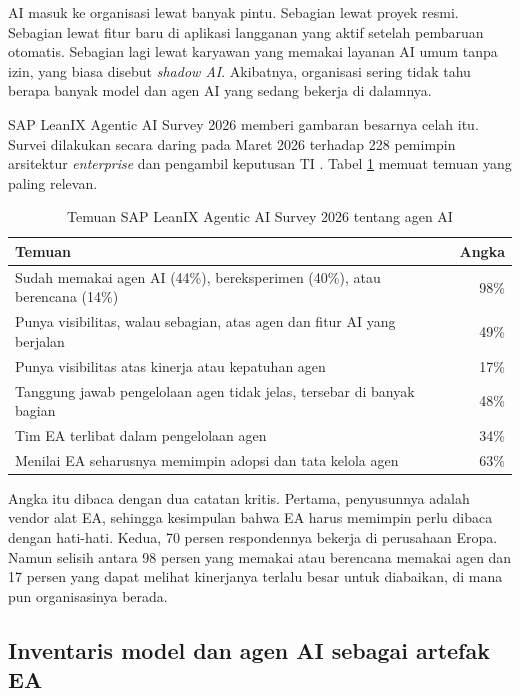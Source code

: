 AI masuk ke organisasi lewat banyak pintu. Sebagian lewat proyek resmi.
Sebagian lewat fitur baru di aplikasi langganan yang aktif setelah pembaruan
otomatis. Sebagian lagi lewat karyawan yang memakai layanan AI umum tanpa
izin, yang biasa disebut \textit{shadow AI}. Akibatnya, organisasi sering tidak
tahu berapa banyak model dan agen AI yang sedang bekerja di dalamnya.

SAP LeanIX Agentic AI Survey 2026 memberi gambaran besarnya celah itu. Survei
dilakukan secara daring pada Maret 2026 terhadap 228 pemimpin arsitektur
\textit{enterprise} dan pengambil keputusan TI \cite{leanix2026}. Tabel
\ref{tab:ch10-leanix} memuat temuan yang paling relevan.

\begin{table}[!htb]
  \centering
  \caption{Temuan SAP LeanIX Agentic AI Survey 2026 tentang agen AI}
  \label{tab:ch10-leanix}
  \small
  \begin{tabularx}{\textwidth}{Xr}
    \hline
    \textbf{Temuan} & \textbf{Angka} \\
    \hline
    Sudah memakai agen AI (44\%), bereksperimen (40\%), atau berencana (14\%) & 98\% \\
    \hline
    Punya visibilitas, walau sebagian, atas agen dan fitur AI yang berjalan & 49\% \\
    \hline
    Punya visibilitas atas kinerja atau kepatuhan agen & 17\% \\
    \hline
    Tanggung jawab pengelolaan agen tidak jelas, tersebar di banyak bagian & 48\% \\
    \hline
    Tim EA terlibat dalam pengelolaan agen & 34\% \\
    \hline
    Menilai EA seharusnya memimpin adopsi dan tata kelola agen & 63\% \\
    \hline
  \end{tabularx}
\end{table}

Angka itu dibaca dengan dua catatan kritis. Pertama, penyusunnya adalah vendor
alat EA, sehingga kesimpulan bahwa EA harus memimpin perlu dibaca dengan
hati-hati. Kedua, 70 persen respondennya bekerja di perusahaan Eropa. Namun
selisih antara 98 persen yang memakai atau berencana memakai agen dan 17
persen yang dapat melihat kinerjanya terlalu besar untuk diabaikan, di mana
pun organisasinya berada.

\subsection*{Inventaris model dan agen AI sebagai artefak EA}

